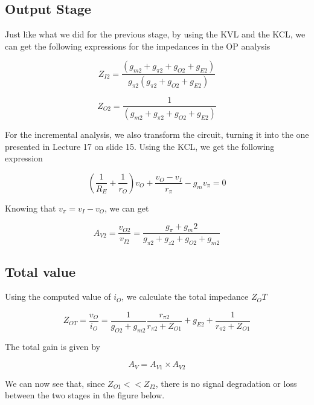 \subsection{Output Stage}
Just like what we did for the previous stage, by using the KVL and the KCL, we can get the following expressions for the impedances in the OP analysis

\begin{equation}
Z_{I2} = \frac{(g_{m2}+g_{\pi 2}+g_{O2}+g_{E2})}{g_{\pi 2}(g_{\pi 2}+g_{O2}+g_{E2})}
\label{eq:1.6}
\end{equation}

\begin{equation}
Z_{O2} = \frac{1}{(g_{m2}+g_{\pi 2}+g_{O2}+g_{E2})}
\label{eq:1.7}
\end{equation}

For the incremental analysis, we also transform the circuit, turning it into the one presented in Lecture 17 on slide 15. Using the KCL, we get the following expression

\begin{equation}
(\frac{1}{R_E}+\frac{1}{r_O})v_O+\frac{v_O-v_I}{r_\pi}-g_mv_\pi = 0
\label{eq:1.8}
\end{equation}

Knowing that $v_\pi = v_I - v_O$, we can get

\begin{equation}
A_{V2} = \frac{v_{O2}}{v_{I2}} = \frac{g_\pi+g_m2}{g_{\pi 2}+g_{z2}+g_{O2}+g_{m2}}
\label{eq:1.9}
\end{equation}

\subsection{Total value}
Using the computed value of $i_O$, we calculate the total impedance $Z_OT$

\begin{equation}
Z_{OT} = \frac{v_O}{i_O} = \frac{1}{g_{O2}+g_{m2}}\frac{r_{\pi 2}}{r_{\pi 2} + Z_{O1}}+g_{E2}+\frac{1}{r_{\pi 2} + Z_{O1}}
\label{eq:1.10}
\end{equation}

The total gain is given by

\begin{equation}
A_V = A_{V1} \times A_{V2}
\label{eq:1.11}
\end{equation}

We can now see that, since $Z_{O1}<<Z_{I2}$, there is no signal degradation or loss between the two stages in the figure below.

